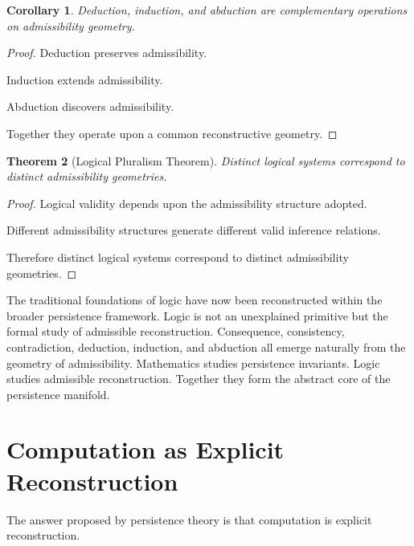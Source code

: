 \documentclass[12pt,oneside]{article}
\newtheorem{theorem}{Theorem}[section] \newtheorem{lemma}[theorem]{Lemma} \newtheorem{proposition}[theorem]{Proposition} \newtheorem{corollary}[theorem]{Corollary}
\theoremstyle{definition}
\begin{document}
\begin{corollary}

Deduction, induction, and abduction are complementary operations on admissibility geometry.

\end{corollary}

\begin{proof}

Deduction preserves admissibility.

Induction extends admissibility.

Abduction discovers admissibility.

Together they operate upon a common reconstructive geometry.

\end{proof}

\begin{theorem}[Logical Pluralism Theorem]

Distinct logical systems correspond to distinct admissibility geometries.

\end{theorem}

\begin{proof}

Logical validity depends upon the admissibility structure adopted.

Different admissibility structures generate different valid inference relations.

Therefore distinct logical systems correspond to distinct admissibility geometries.

\end{proof}

The traditional foundations of logic have now been reconstructed within the broader persistence framework. Logic is not an unexplained primitive but the formal study of admissible reconstruction. Consequence, consistency, contradiction, deduction, induction, and abduction all emerge naturally from the geometry of admissibility. Mathematics studies persistence invariants. Logic studies admissible reconstruction. Together they form the abstract core of the persistence manifold.

\section{Computation as Explicit Reconstruction}

The answer proposed by persistence theory is that computation is explicit reconstruction.
\end{document}

